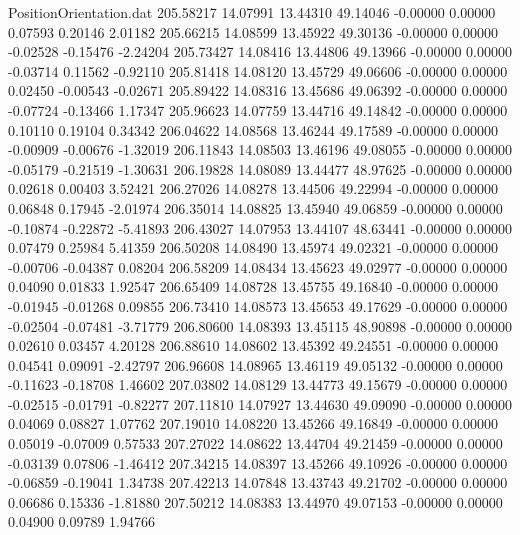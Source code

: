 \begin{filecontents}{PositionOrientation.dat}
 205.58217   14.07991   13.44310    49.14046   -0.00000    0.00000    0.07593    0.20146    2.01182
 205.66215   14.08599   13.45922    49.30136   -0.00000    0.00000   -0.02528   -0.15476   -2.24204
 205.73427   14.08416   13.44806    49.13966   -0.00000    0.00000   -0.03714    0.11562   -0.92110
 205.81418   14.08120   13.45729    49.06606   -0.00000    0.00000    0.02450   -0.00543   -0.02671
 205.89422   14.08316   13.45686    49.06392   -0.00000    0.00000   -0.07724   -0.13466    1.17347
 205.96623   14.07759   13.44716    49.14842   -0.00000    0.00000    0.10110    0.19104    0.34342
 206.04622   14.08568   13.46244    49.17589   -0.00000    0.00000   -0.00909   -0.00676   -1.32019
 206.11843   14.08503   13.46196    49.08055   -0.00000    0.00000   -0.05179   -0.21519   -1.30631
 206.19828   14.08089   13.44477    48.97625   -0.00000    0.00000    0.02618    0.00403    3.52421
 206.27026   14.08278   13.44506    49.22994   -0.00000    0.00000    0.06848    0.17945   -2.01974
 206.35014   14.08825   13.45940    49.06859   -0.00000    0.00000   -0.10874   -0.22872   -5.41893
 206.43027   14.07953   13.44107    48.63441   -0.00000    0.00000    0.07479    0.25984    5.41359
 206.50208   14.08490   13.45974    49.02321   -0.00000    0.00000   -0.00706   -0.04387    0.08204
 206.58209   14.08434   13.45623    49.02977   -0.00000    0.00000    0.04090    0.01833    1.92547
 206.65409   14.08728   13.45755    49.16840   -0.00000    0.00000   -0.01945   -0.01268    0.09855
 206.73410   14.08573   13.45653    49.17629   -0.00000    0.00000   -0.02504   -0.07481   -3.71779
 206.80600   14.08393   13.45115    48.90898   -0.00000    0.00000    0.02610    0.03457    4.20128
 206.88610   14.08602   13.45392    49.24551   -0.00000    0.00000    0.04541    0.09091   -2.42797
 206.96608   14.08965   13.46119    49.05132   -0.00000    0.00000   -0.11623   -0.18708    1.46602
 207.03802   14.08129   13.44773    49.15679   -0.00000    0.00000   -0.02515   -0.01791   -0.82277
 207.11810   14.07927   13.44630    49.09090   -0.00000    0.00000    0.04069    0.08827    1.07762
 207.19010   14.08220   13.45266    49.16849   -0.00000    0.00000    0.05019   -0.07009    0.57533
 207.27022   14.08622   13.44704    49.21459   -0.00000    0.00000   -0.03139    0.07806   -1.46412
 207.34215   14.08397   13.45266    49.10926   -0.00000    0.00000   -0.06859   -0.19041    1.34738
 207.42213   14.07848   13.43743    49.21702   -0.00000    0.00000    0.06686    0.15336   -1.81880
 207.50212   14.08383   13.44970    49.07153   -0.00000    0.00000    0.04900    0.09789    1.94766

\end{filecontents}

